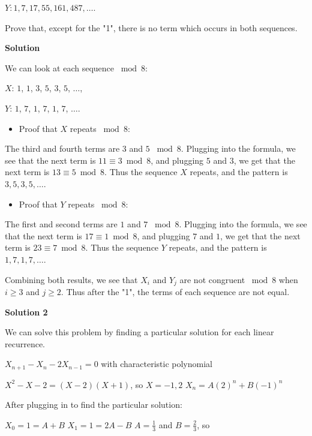 \begin{enumerate}
  $Y:1, 7, 17, 55, 161, 487, \dots$.

 Prove that, except for the "1", there is no term which occurs in both sequences.


 



\textbf{Solution}

We can look at each sequence $\bmod{8}$:

 $X$: $1$, $1$, $3$, $5$, $3$, $5$, $\dots$,

 $Y$: $1$, $7$, $1$, $7$, $1$, $7$, $\dots$.

 
            \begin{itemize}
        \item Proof that $X$ repeats $\bmod{8}$:
            \end{itemize}
            The third and fourth terms are $3$ and $5$ $\bmod{8}$. Plugging into the formula, we see that the next term is $11\equiv 3\bmod{8}$, and plugging $5$ and $3$, we get that the next term is $13\equiv 5\bmod{8}$. Thus the sequence $X$ repeats, and the pattern is $3,5,3,5,\dots$.

 
            \begin{itemize}
        \item Proof that $Y$ repeats $\bmod{8}$:
            \end{itemize}
            The first and second terms are $1$ and $7$ $\bmod{8}$. Plugging into the formula, we see that the next term is $17\equiv 1\bmod{8}$, and plugging $7$ and $1$, we get that the next term is $23\equiv 7\bmod{8}$. Thus the sequence $Y$ repeats, and the pattern is $1,7,1,7,\dots$.

 


 Combining both results, we see that $X_i$ and $Y_j$ are not congruent $\bmod{8}$ when $i\geq 3$ and $j\geq 2$. Thus after the "1", the terms of each sequence are not equal.

 


 



\textbf{Solution 2}

We can solve this problem by finding a particular solution for each linear recurrence.

 $X_{n+1} - X_n - 2X_{n-1} = 0$ with characteristic polynomial

 $X^2 - X - 2 = (X - 2)(X + 1)$, so $X = -1, 2$
$X_n = A(2)^n + B(-1)^n$

 After plugging in to find the particular solution:

 $X_0 = 1 = A + B$
$X_1 = 1 = 2A - B$
$A = \frac{1}{3}$ and $B = \frac{2}{3}$, so


\end{enumerate}
